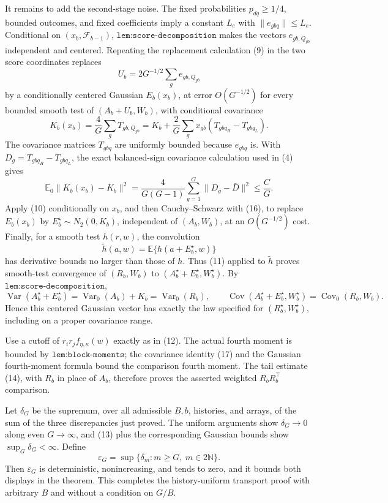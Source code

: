 It remains to add the second-stage noise.  The fixed probabilities \(p_{dq}\geq1/4\), bounded outcomes, and fixed coefficients imply a constant \(L_e\) with \(\|e_{gbq}\|\leq L_e\).  Conditional on \((x_b,\mathcal F_{b-1})\), \(\texttt{lem:score-decomposition}\) makes the vectors \(e_{gb,Q_{gb}}\) independent and centered.  Repeating the replacement calculation (9) in the two score coordinates replaces
\[
 U_b=2G^{-1/2}\sum_ge_{gb,Q_{gb}}
\]
by a conditionally centered Gaussian \(E_b(x_b)\), at error \(O(G^{-1/2})\) for every bounded smooth test of \((A_b+U_b,W_b)\), with conditional covariance
\[
 K_b(x_b)=\frac4G\sum_gT_{gb,Q_{gb}}
 =K_b+\frac2G\sum_gx_{gb}(T_{gbq_H}-T_{gbq_L}).            \tag{15}
\]
The covariance matrices \(T_{gbq}\) are uniformly bounded because \(e_{gbq}\) is.  With \(D_g=T_{gbq_H}-T_{gbq_L}\), the exact balanced-sign covariance calculation used in (4) gives
\[
 \mathbb E_0\|K_b(x_b)-K_b\|^2
 =\frac4{G(G-1)}\sum_{g=1}^G\|D_g-\bar D\|^2
 \leq \frac CG.                                           \tag{16}
\]
Apply (10) conditionally on \(x_b\), and then Cauchy--Schwarz with (16), to replace \(E_b(x_b)\) by \(E_b^\star\sim N_2(0,K_b)\), independent of \((A_b,W_b)\), at an \(O(G^{-1/2})\) cost.  Finally, for a smooth test \(h(r,w)\), the convolution
\[
 \widetilde h(a,w)=\mathbb E\{h(a+E_b^\star,w)\}
\]
has derivative bounds no larger than those of \(h\).  Thus (11) applied to \(\widetilde h\) proves smooth-test convergence of \((R_b,W_b)\) to \((A_b^\star+E_b^\star,W_b^\star)\).  By \(\texttt{lem:score-decomposition}\),
\[
 \operatorname{Var}(A_b^\star+E_b^\star)=\operatorname{Var}_0(A_b)+K_b
 =\operatorname{Var}_0(R_b),
 \qquad
 \operatorname{Cov}(A_b^\star+E_b^\star,W_b^\star)
 =\operatorname{Cov}_0(R_b,W_b).                            \tag{17}
\]
Hence this centered Gaussian vector has exactly the law specified for \((R_b^\star,W_b^\star)\), including on a proper covariance range.

Use a cutoff of \(r_ir_jf_{\eta,\kappa}(w)\) exactly as in (12).  The actual fourth moment is bounded by \(\texttt{lem:block-moments}\); the covariance identity (17) and the Gaussian fourth-moment formula bound the comparison fourth moment.  The tail estimate (14), with \(R_b\) in place of \(A_b\), therefore proves the asserted weighted \(R_bR_b^\top\) comparison.

Let \(\delta_G\) be the supremum, over all admissible \(B,b\), histories, and arrays, of the sum of the three discrepancies just proved.  The uniform arguments show \(\delta_G\to0\) along even \(G\to\infty\), and (13) plus the corresponding Gaussian bounds show \(\sup_G\delta_G<\infty\).  Define
\[
 \varepsilon_G=\sup\{\delta_m:m\geq G,\ m\in2\mathbb N\}.
\]
Then \(\varepsilon_G\) is deterministic, nonincreasing, and tends to zero, and it bounds both displays in the theorem.  This completes the history-uniform transport proof with arbitrary \(B\) and without a condition on \(G/B\).